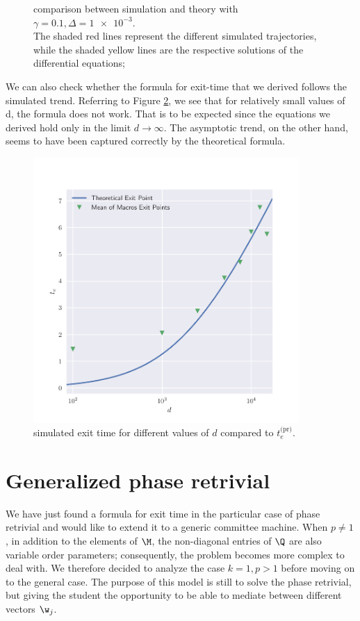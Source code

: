 \begin{figure}
  \caption{
    comparison between simulation and theory with \(\gamma=\num{0.1}, \Delta=\num{1e-3}\).\\
    The shaded red lines represent the different simulated trajectories,
    while the shaded yellow lines are the respective solutions of the differential equations; 
  }
  \label{fig:spherical-phase-retrivial-d10000}
\end{figure}
We can also check whether the formula for exit-time that we derived follows the simulated trend.
Referring to Figure \ref{fig:spherical-phase-retrivial-with-d}, we see that for relatively small values of d, the formula does not work.
That is to be expected since the equations we derived hold only in the limit \(d\to\infty\).
The asymptotic trend, on the other hand, seems to have been captured correctly by the theoretical formula.
\begin{figure}
  \centering
  \includegraphics[width=0.9\textwidth]{figures/spherical/phase-retrivial-dplot.pdf}
  \caption{
    simulated exit time for different values of \(d\) compared to \(t^\text{(pr)}_e\).
  }
  \label{fig:spherical-phase-retrivial-with-d}
\end{figure}

\section{Generalized phase retrivial} %
We have just found a formula for exit time in the particular case of phase retrivial and would like to extend it to a generic committee machine.
When \(p\neq1\), in addition to the elements of \(\M\), the non-diagonal entries of \(\Q\) are also variable order parameters;
consequently, the problem becomes more complex to deal with.
We therefore decided to analyze the case \(k=1,p>1\) before moving on to the general case.
The purpose of this model is still to solve the phase retrivial,
but giving the student the opportunity to be able to mediate between different vectors \(\w_j\).

